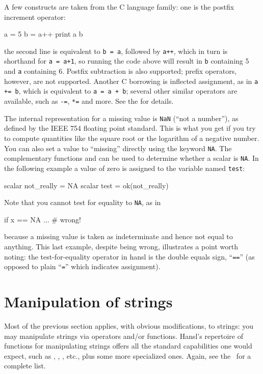 A few constructs are taken from the C language family: one is the
postfix increment operator:
\begin{code}
  a = 5
  b = a++
  print a b
\end{code}
the second line is equivalent to \texttt{b = a}, followed by
\texttt{a++}, which in turn is shorthand for \texttt{a = a+1}, so
running the code above will result in \texttt{b} containing 5 and
\texttt{a} containing 6. Postfix subtraction is also supported; prefix
operators, however, are not supported. Another C borrowing is
inflected assignment, as in \texttt{a += b}, which is equivalent to
\texttt{a = a + b}; several other similar operators are available,
such as \texttt{-=}, \texttt{*=} and more. See the \GCR{} for details.

The internal representation for a missing value is \texttt{NaN} (``not
a number''), as defined by the IEEE 754 floating point standard.  This
is what you get if you try to compute quantities like the square root
or the logarithm of a negative number. You can also set a value to
``missing'' directly using the keyword \texttt{NA}.  The complementary
functions  and  can be used to determine whether
a scalar is \texttt{NA}. In the following example a value of zero is
assigned to the variable named \texttt{test}:
\begin{code}
  scalar not_really = NA
  scalar test = ok(not_really)
\end{code}
Note that you cannot test for equality to \texttt{NA}, as in
\begin{code}
  if x == NA ... # wrong!
\end{code}
because a missing value is taken as indeterminate and hence not equal
to anything. This last example, despite being wrong, illustrates a
point worth noting: the test-for-equality operator in hansl is the
double equals sign, ``\texttt{==}'' (as opposed to plain
``\texttt{=}'' which indicates assignment).

\section{Manipulation of strings}

Most of the previous section applies, with obvious modifications, to
strings: you may manipulate strings via operators and/or
functions. Hansl's repertoire of functions for manipulating strings
offers all the standard capabilities one would expect, such as
, , , etc., plus some more
specialized ones. Again, see the \GCR\ for a complete list.


